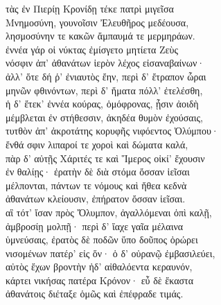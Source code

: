 \quad{}τὰς ἐν Πιερίῃ Κρονίδῃ τέκε πατρὶ μιγεῖσα\\
Μνημοσύνη, γουνοῖσιν Ἐλευθῆρος μεδέουσα,\\
λησμοσύνην τε κακῶν ἄμπαυμά τε μερμηράων. \\
ἐννέα γάρ οἱ νύκτας ἐμίσγετο μητίετα Ζεὺς\\
νόσφιν ἀπ' ἀθανάτων ἱερὸν λέχος εἰσαναβαίνων·\\
ἀλλ' ὅτε δή ῥ' ἐνιαυτὸς ἔην, περὶ δ' ἔτραπον ὧραι\\
μηνῶν φθινόντων, περὶ δ' ἤματα πόλλ' ἐτελέσθη,\\
ἡ δ' ἔτεκ' ἐννέα κούρας, ὁμόφρονας, ᾗσιν ἀοιδὴ  \\
μέμβλεται ἐν στήθεσσιν, ἀκηδέα θυμὸν ἐχούσαις,\\
τυτθὸν ἀπ' ἀκροτάτης κορυφῆς νιφόεντος Ὀλύμπου·\\
ἔνθά σφιν λιπαροί τε χοροὶ καὶ δώματα καλά,\\
πὰρ δ' αὐτῇς Χάριτές τε καὶ Ἵμερος οἰκί' ἔχουσιν\\
ἐν θαλίῃς· ἐρατὴν δὲ διὰ στόμα ὄσσαν ἱεῖσαι  \\
μέλπονται, πάντων τε νόμους καὶ ἤθεα κεδνὰ \\
ἀθανάτων κλείουσιν, ἐπήρατον ὄσσαν ἱεῖσαι.\\
αἳ τότ' ἴσαν πρὸς Ὄλυμπον, ἀγαλλόμεναι ὀπὶ καλῇ, \\
ἀμβροσίῃ μολπῇ· περὶ δ' ἴαχε γαῖα μέλαινα \\
ὑμνεύσαις, ἐρατὸς δὲ ποδῶν ὕπο δοῦπος ὀρώρει \\
νισομένων πατέρ' εἰς ὅν· ὁ δ' οὐρανῷ ἐμβασιλεύει, \\
αὐτὸς ἔχων βροντὴν ἠδ' αἰθαλόεντα κεραυνόν,\\
κάρτει νικήσας πατέρα Κρόνον· εὖ δὲ ἕκαστα \\
ἀθανάτοις διέταξε ὁμῶς καὶ ἐπέφραδε τιμάς.

